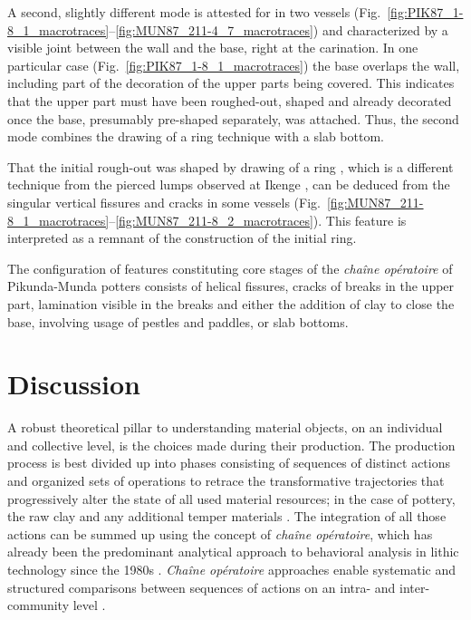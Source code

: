 \documentclass[smallextended,natbib]{svjour3}       %
\begin{document}
A second, slightly different mode is attested for in two vessels (Fig.~\ref{fig:PIK87_1-8_1_macrotraces}--\ref{fig:MUN87_211-4_7_macrotraces}) and characterized by a visible joint between the wall and the base, right at the carination. In one particular case (Fig.~\ref{fig:PIK87_1-8_1_macrotraces}) the base overlaps the wall, including part of the decoration of the upper parts being covered. This indicates that the upper part must have been roughed-out, shaped and already decorated once the base, presumably pre-shaped separately, was attached. Thus, the second mode combines the drawing of a ring technique with a slab bottom.

That the initial rough-out was shaped by drawing of a ring \citep[cf]{LivingstoneSmith.2010a}, which is a different technique from the pierced lumps observed at Ikenge \citep{Eggert.1980c,KanimbaMisago.1991}, can be deduced from the singular vertical fissures and cracks in some vessels (Fig.~\ref{fig:MUN87_211-8_1_macrotraces}--\ref{fig:MUN87_211-8_2_macrotraces}). This feature is interpreted as a remnant of the construction of the initial ring.

The configuration of features constituting core stages of the \textit{chaîne opératoire} of Pikunda-Munda potters consists of helical fissures, cracks of breaks in the upper part, lamination visible in the breaks and either the addition of clay to close the base, involving usage of pestles and paddles, or slab bottoms. 

\section{Discussion}


A robust theoretical pillar to understanding material objects, on an individual and collective level, is the choices made during their production. The production process is best divided up into phases consisting of sequences of distinct actions and organized sets of operations to retrace the transformative trajectories that progressively alter the state of all used material resources; in the case of pottery, the raw clay and any additional temper materials \citep[3--4]{Gosselain.2018}. The integration of all those actions can be summed up using the concept of \textit{chaîne opératoire}, which has already been the predominant analytical approach to behavioral analysis in lithic technology since the 1980s \citep{Pelegrin.1988}. \textit{Chaîne opératoire} approaches enable systematic and structured comparisons between sequences of actions on an intra- and inter-community level \citep{Gosselain.1992,LivingstoneSmith.2007d,Ard.2014,Gomart.2014}.
\end{document}
